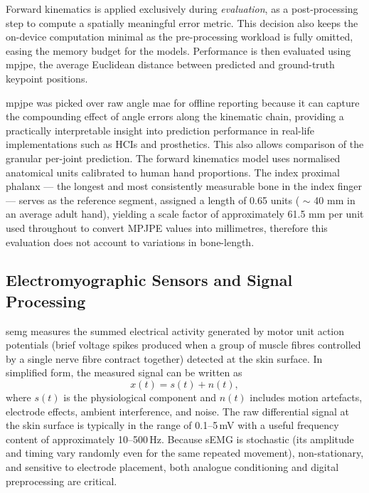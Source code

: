 \documentclass[11pt]{article}
\begin{document}
Forward kinematics is applied exclusively during \emph{evaluation}, as a post-processing step to compute a spatially meaningful error metric. This decision also keeps the on-device computation minimal as the pre-processing workload is fully omitted, easing the memory budget for the models. Performance is then evaluated using \gls{mpjpe}, the average Euclidean distance between predicted and ground-truth keypoint positions.

\gls{mpjpe} was picked over raw angle \gls{mae} for offline reporting because it can capture the compounding effect of angle errors along the kinematic chain, providing a practically interpretable insight into prediction performance in real-life implementations such as HCIs and prosthetics. This also allows comparison of the granular per-joint prediction. The forward kinematics model uses normalised anatomical units calibrated to human hand proportions. The index proximal phalanx — the longest and most consistently measurable bone in the index finger — serves as the reference segment, assigned a length of 0.65 units ( $\sim$ 40 mm in an average adult hand), yielding a scale factor of approximately 61.5 mm per unit used throughout to convert MPJPE values into millimetres, therefore this evaluation does not account to variations in bone-length. 

\subsection{Electromyographic Sensors and Signal Processing}
\label{sec:emg}
\Gls{semg} measures the summed electrical activity generated by motor unit action potentials (brief voltage spikes produced when a group of muscle fibres controlled by a single nerve fibre contract together) detected at the skin surface. In simplified form, the measured signal can be written as
\begin{equation}
x(t) = s(t) + n(t),
\end{equation}
where $s(t)$ is the physiological component and $n(t)$ includes motion artefacts, electrode effects, ambient interference, and noise. The raw differential signal at the skin surface is typically in the range of 0.1--5\,mV with a useful frequency content of approximately 10--500\,Hz. Because sEMG is stochastic (its amplitude and timing vary randomly even for the same repeated movement), non-stationary, and sensitive to electrode placement, both analogue conditioning and digital preprocessing are critical.
\end{document}

